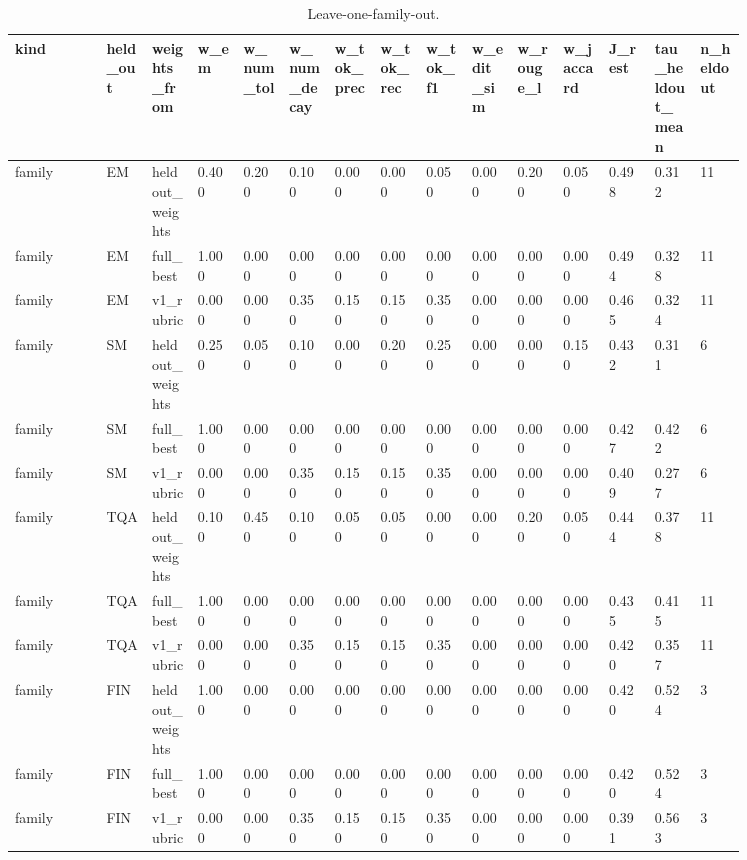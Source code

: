 \begin{landscape}
\tiny
\setlength{\tabcolsep}{3pt}
\begin{longtable}{p{0.105\linewidth}p{0.053\linewidth}p{0.053\linewidth}p{0.053\linewidth}p{0.053\linewidth}p{0.053\linewidth}p{0.053\linewidth}p{0.053\linewidth}p{0.053\linewidth}p{0.053\linewidth}p{0.053\linewidth}p{0.053\linewidth}p{0.053\linewidth}p{0.053\linewidth}p{0.053\linewidth}}
\caption{Leave-one-family-out.}\label{tab:lofo_full}\\
\toprule
kind & held\_\allowbreak{}out & weights\_\allowbreak{}from & w\_\allowbreak{}em & w\_\allowbreak{}num\_\allowbreak{}tol & w\_\allowbreak{}num\_\allowbreak{}decay & w\_\allowbreak{}tok\_\allowbreak{}prec & w\_\allowbreak{}tok\_\allowbreak{}rec & w\_\allowbreak{}tok\_\allowbreak{}f1 & w\_\allowbreak{}edit\_\allowbreak{}sim & w\_\allowbreak{}rouge\_\allowbreak{}l & w\_\allowbreak{}jaccard & J\_\allowbreak{}rest & tau\_\allowbreak{}heldout\_\allowbreak{}mean & n\_\allowbreak{}heldout \\
\midrule
family & EM & heldout\_\allowbreak{}weights & 0.400 & 0.200 & 0.100 & 0.000 & 0.000 & 0.050 & 0.000 & 0.200 & 0.050 & 0.498 & 0.312 & 11 \\
family & EM & full\_\allowbreak{}best & 1.000 & 0.000 & 0.000 & 0.000 & 0.000 & 0.000 & 0.000 & 0.000 & 0.000 & 0.494 & 0.328 & 11 \\
family & EM & v1\_\allowbreak{}rubric & 0.000 & 0.000 & 0.350 & 0.150 & 0.150 & 0.350 & 0.000 & 0.000 & 0.000 & 0.465 & 0.324 & 11 \\
family & SM & heldout\_\allowbreak{}weights & 0.250 & 0.050 & 0.100 & 0.000 & 0.200 & 0.250 & 0.000 & 0.000 & 0.150 & 0.432 & 0.311 & 6 \\
family & SM & full\_\allowbreak{}best & 1.000 & 0.000 & 0.000 & 0.000 & 0.000 & 0.000 & 0.000 & 0.000 & 0.000 & 0.427 & 0.422 & 6 \\
family & SM & v1\_\allowbreak{}rubric & 0.000 & 0.000 & 0.350 & 0.150 & 0.150 & 0.350 & 0.000 & 0.000 & 0.000 & 0.409 & 0.277 & 6 \\
family & TQA & heldout\_\allowbreak{}weights & 0.100 & 0.450 & 0.100 & 0.050 & 0.050 & 0.000 & 0.000 & 0.200 & 0.050 & 0.444 & 0.378 & 11 \\
family & TQA & full\_\allowbreak{}best & 1.000 & 0.000 & 0.000 & 0.000 & 0.000 & 0.000 & 0.000 & 0.000 & 0.000 & 0.435 & 0.415 & 11 \\
family & TQA & v1\_\allowbreak{}rubric & 0.000 & 0.000 & 0.350 & 0.150 & 0.150 & 0.350 & 0.000 & 0.000 & 0.000 & 0.420 & 0.357 & 11 \\
family & FIN & heldout\_\allowbreak{}weights & 1.000 & 0.000 & 0.000 & 0.000 & 0.000 & 0.000 & 0.000 & 0.000 & 0.000 & 0.420 & 0.524 & 3 \\
family & FIN & full\_\allowbreak{}best & 1.000 & 0.000 & 0.000 & 0.000 & 0.000 & 0.000 & 0.000 & 0.000 & 0.000 & 0.420 & 0.524 & 3 \\
family & FIN & v1\_\allowbreak{}rubric & 0.000 & 0.000 & 0.350 & 0.150 & 0.150 & 0.350 & 0.000 & 0.000 & 0.000 & 0.391 & 0.563 & 3 \\
\bottomrule
\end{longtable}
\normalsize
\end{landscape}
